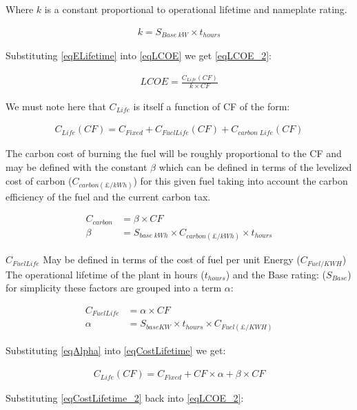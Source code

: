 \documentclass[11pt]{article}
\numberwithin{equation}{section}
\begin{document}
Where \(k\) is a constant proportional to operational lifetime and nameplate rating.

\begin{align}
\label{eqk}
k = S_{Base\; kW} \times t_{hours}
\end{align}

Substituting \ref{eqELifetime} into \ref{eqLCOE} we get \ref{eqLCOE_2}:

\begin{align}
\label{eqLCOE_2}
LCOE = \frac{C_{Life}(CF)}{k\times CF}
\end{align}

We must note here that \(C_{Life}\) is itself a function of CF of the form:

\begin{align}
\label{eqCostLifetime}
C_{Life}(CF) = C_{Fixed}+C_{Fuel Life}(CF)+C_{carbon\;Life}(CF)
\end{align}

The carbon cost of burning the fuel will be roughly proportional to the CF and may be defined with the constant \(\beta\) which can be defined in terms of the levelized cost of carbon (\(C_{carbon (\pounds/kWh)}\)) for this given fuel taking into account the carbon efficiency of the fuel and the current carbon tax.

\begin{align}
\label{eqCFuel}
C_{carbon} &= \beta \times CF\\
\beta &= S_{base\;kWh} \times C_{carbon (\pounds/kWh)} \times t_{hours}
\end{align}

\(C_{Fuel Life}\) May be defined in terms of the cost of fuel per unit Energy (\(C_{Fuel/KWH}\)) The operational lifetime of the plant in hours (\(t_{hours}\)) and the Base rating: (\(S_{Base}\)) for simplicity these factors are grouped into a term \(\alpha\):

\begin{align}
\label{eqAlpha}
C_{Fuel Life} &= \alpha\times CF\\
\alpha &= S_{base KW}\times t_{hours} \times C_{Fuel(\pounds/KWH)}
\end{align}

Substituting \ref{eqAlpha} into \ref{eqCostLifetime} we get:

\begin{align}
\label{eqCostLifetime_2}
C_{Life}(CF) = C_{Fixed}+CF\times \alpha + \beta \times CF
\end{align}

Substituting \ref{eqCostLifetime_2} back into \ref{eqLCOE_2}:
\end{document}
